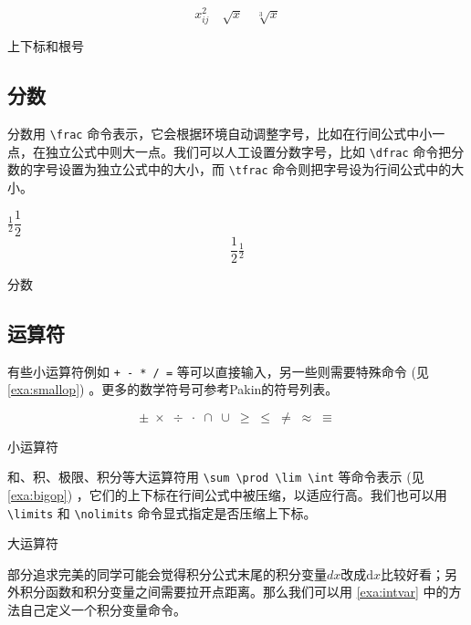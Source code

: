 \begin{example}[h]
\begin{BTDemo}[]
\[ x_{ij}^2\quad \sqrt{x}\quad \sqrt[3]{x} \]
\end{BTDemo}
\caption{上下标和根号}
\end{example}

\subsection{分数}

分数用 \verb|\frac| 命令表示，它会根据环境自动调整字号，比如在行间公式中小一点，在独立公式中则大一点。我们可以人工设置分数字号，比如 \verb|\dfrac| 命令把分数的字号设置为独立公式中的大小，而 \verb|\tfrac| 命令则把字号设为行间公式中的大小。

\begin{example}[h]
\begin{RLDemo}[]
$ \frac{1}{2} \dfrac{1}{2} $
\[ \frac{1}{2} 
  \tfrac{1}{2} \]
\end{RLDemo}
\caption{分数}
\end{example}

\subsection{运算符}

有些小运算符例如 \verb|+ - * / =| 等可以直接输入，另一些则需要特殊命令 (见 \autoref{exa:smallop}) 。更多的数学符号可参考Pakin\indexPakin 的符号列表\citep{Pakin_comprehensive}。

\begin{example}[h]
\begin{BTDemo}[]
\[ \pm\; \times\; \div\; \cdot\; \cap\; \cup\; 
  \geq\; \leq\; \neq\; \approx\; \equiv \]
\end{BTDemo}
\caption{小运算符}
\label{exa:smallop}
\end{example}

和、积、极限、积分等大运算符用 \verb|\sum \prod \lim \int| 等命令表示 (见 \autoref{exa:bigop}) ，它们的上下标在行间公式中被压缩，以适应行高。我们也可以用 \verb|\limits| 和 \verb|\nolimits| 命令显式指定是否压缩上下标。

\begin{example}[h]
\caption{大运算符}
\label{exa:bigop}
\end{example}

部分追求完美的同学可能会觉得积分公式末尾的积分变量$dx$改成$\mathrm{d}x$比较好看；另外积分函数和积分变量之间需要拉开点距离。那么我们可以用 \autoref{exa:intvar} 中的方法自己定义一个积分变量命令。

